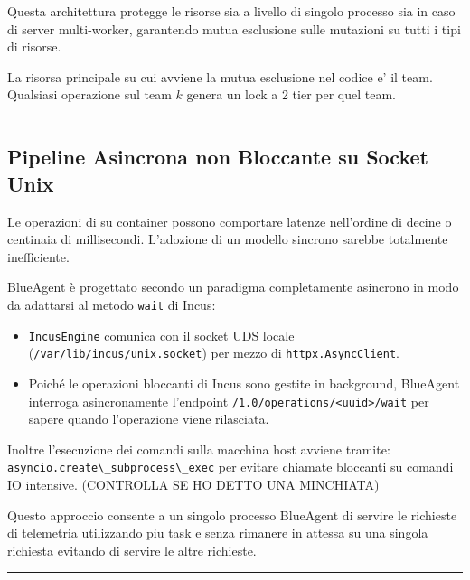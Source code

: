 Questa architettura protegge le risorse sia a livello di singolo
processo sia in caso di server multi-worker, garantendo mutua esclusione
sulle mutazioni su tutti i tipi di risorse.

La risorsa principale su cui avviene la mutua esclusione nel codice e'
il team. Qualsiasi operazione sul team \(k\) genera un lock a 2 tier per
quel team.

\begin{center}\rule{0.5\linewidth}{0.5pt}\end{center}

\subsection{Pipeline Asincrona non Bloccante su Socket
Unix}\label{pipeline-asincrona-non-bloccante-su-socket-unix}

Le operazioni di su container possono comportare latenze nell'ordine di
decine o centinaia di millisecondi. L'adozione di un modello sincrono
sarebbe totalmente inefficiente.

BlueAgent è progettato secondo un paradigma completamente asincrono in
modo da adattarsi al metodo \passthrough{\lstinline!wait!} di Incus:

\begin{itemize}
\tightlist
\item
  \passthrough{\lstinline!IncusEngine!} comunica con il socket UDS
  locale (\passthrough{\lstinline!/var/lib/incus/unix.socket!}) per
  mezzo di \passthrough{\lstinline!httpx.AsyncClient!}.
\item
  Poiché le operazioni bloccanti di Incus sono gestite in background,
  BlueAgent interroga asincronamente l'endpoint
  \passthrough{\lstinline!/1.0/operations/<uuid>/wait!} per sapere
  quando l'operazione viene rilasciata.
\end{itemize}

Inoltre l'esecuzione dei comandi sulla macchina host avviene tramite:
\passthrough{\lstinline!asyncio.create\_subprocess\_exec!} per evitare
chiamate bloccanti su comandi IO intensive. (CONTROLLA SE HO DETTO UNA
MINCHIATA)

Questo approccio consente a un singolo processo BlueAgent di servire le
richieste di telemetria utilizzando piu task e senza rimanere in attessa
su una singola richiesta evitando di servire le altre richieste.

\begin{center}\rule{0.5\linewidth}{0.5pt}\end{center}

